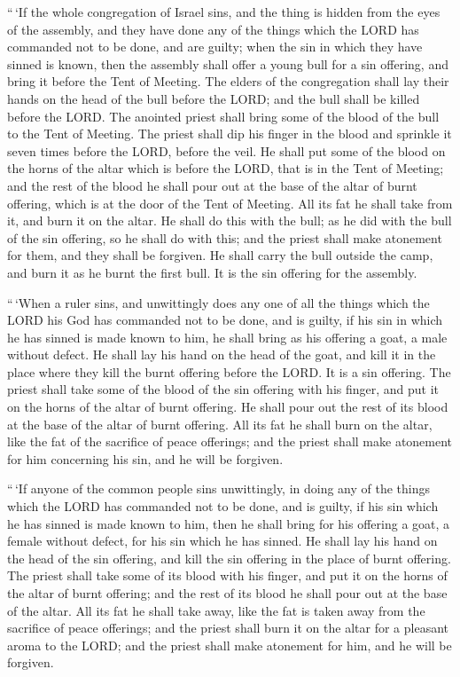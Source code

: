  ``\,`If the whole congregation of Israel sins, and the
thing is hidden from the eyes of the assembly, and they have done any of
the things which the LORD has commanded not to be done, and are guilty;
 when the sin in which they have sinned is known, then the
assembly shall offer a young bull for a sin offering, and bring it
before the Tent of Meeting.  The elders of the congregation
shall lay their hands on the head of the bull before the LORD; and the
bull shall be killed before the LORD.  The anointed priest
shall bring some of the blood of the bull to the Tent of Meeting.
 The priest shall dip his finger in the blood and sprinkle
it seven times before the LORD, before the veil.  He shall
put some of the blood on the horns of the altar which is before the
LORD, that is in the Tent of Meeting; and the rest of the blood he shall
pour out at the base of the altar of burnt offering, which is at the
door of the Tent of Meeting.  All its fat he shall take
from it, and burn it on the altar.  He shall do this with
the bull; as he did with the bull of the sin offering, so he shall do
with this; and the priest shall make atonement for them, and they shall
be forgiven.  He shall carry the bull outside the camp, and
burn it as he burnt the first bull. It is the sin offering for the
assembly.

 ``\,`When a ruler sins, and unwittingly does any one of
all the things which the LORD his God has commanded not to be done, and
is guilty,  if his sin in which he has sinned is made known
to him, he shall bring as his offering a goat, a male without defect.
 He shall lay his hand on the head of the goat, and kill it
in the place where they kill the burnt offering before the LORD. It is a
sin offering.  The priest shall take some of the blood of
the sin offering with his finger, and put it on the horns of the altar
of burnt offering. He shall pour out the rest of its blood at the base
of the altar of burnt offering.  All its fat he shall burn
on the altar, like the fat of the sacrifice of peace offerings; and the
priest shall make atonement for him concerning his sin, and he will be
forgiven.

 ``\,`If anyone of the common people sins unwittingly, in
doing any of the things which the LORD has commanded not to be done, and
is guilty,  if his sin which he has sinned is made known to
him, then he shall bring for his offering a goat, a female without
defect, for his sin which he has sinned.  He shall lay his
hand on the head of the sin offering, and kill the sin offering in the
place of burnt offering.  The priest shall take some of its
blood with his finger, and put it on the horns of the altar of burnt
offering; and the rest of its blood he shall pour out at the base of the
altar.  All its fat he shall take away, like the fat is
taken away from the sacrifice of peace offerings; and the priest shall
burn it on the altar for a pleasant aroma to the LORD; and the priest
shall make atonement for him, and he will be forgiven.


